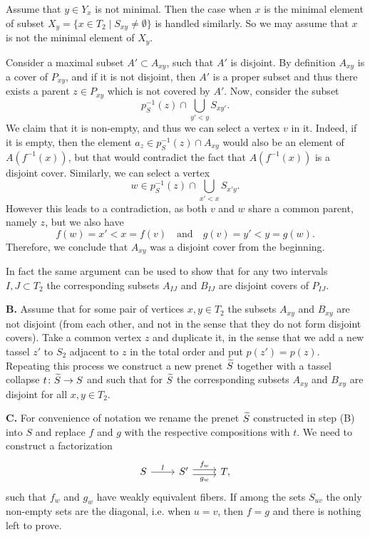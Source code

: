 \documentclass[letterpaper,12pt,leqno]{article}
\numberwithin{equation}{theorem}
\begin{document}
Assume that $y \in Y_x$ is not minimal. Then the case when $x$ is the minimal element of subset $X_y = \{x \in T_2 \mid S_{xy} \neq \emptyset\}$ is handled similarly. So we may
assume that $x$ is not the minimal element of $X_y$.

Consider a maximal subset $A' \subset A_{xy}$, such that $A'$ is disjoint. By definition $A_{xy}$ is a cover of $P_{xy}$, and if it is not disjoint, then $A'$ is a proper subset
and thus there exists a parent $z \in P_{xy}$ which is not covered by $A'$. Now, consider the subset
$$
p_S^{-1}(z) \cap \bigcup_{y' < y} S_{xy'}.
$$
We claim that it is non-empty, and thus we can select a vertex $v$ in it. Indeed, if it is empty, then the element $a_z \in p_S^{-1}(z) \cap A_{xy}$ would also be an element of $A(f^{-1}(x))$,
but that would contradict the fact that $A(f^{-1}(x))$ is a disjoint cover. Similarly, we can select a vertex
$$
w \in p_S^{-1}(z) \cap \bigcup_{x' < x} S_{x'y}.
$$
However this leads to a contradiction, as both $v$ and $w$ share a common parent, namely $z$, but we also have
$$
f(w) = x' < x = f(v) \quad\text{and}\quad g(v) = y' < y = g(w).
$$
Therefore, we conclude that $A_{xy}$ was a disjoint cover from the beginning.

In fact the same argument can be used to show that for any two intervals $I, J \subset T_2$ the corresponding subsets $A_{IJ}$ and $B_{IJ}$ are disjoint covers of $P_{IJ}$.

{\bf B.} Assume that for some pair of vertices $x, y \in T_2$ the subsets $A_{xy}$ and $B_{xy}$ are not disjoint (from each other, and not in the sense that they do not form disjoint covers).
Take a common vertex $z$ and duplicate it, in the sense that we add a new tassel $z'$ to $S_2$ adjacent to $z$ in the total order and put $p(z') = p(z)$. Repeating this process we construct
a new prenet $\widetilde S$ together with a tassel collapse $t\colon \widetilde S \to S$ and such that for $\widetilde S$ the corresponding subsets $A_{xy}$ and $B_{xy}$ are disjoint for all $x, y \in T_2$.

{\bf C.}
For convenience of notation we rename the prenet $\widetilde S$ constructed in step (B) into $S$ and replace $f$ and $g$ with the respective compositions with $t$.
We need to construct a factorization 
$$
\begin{tikzcd}
S \ar[r, "l"] & S' \ar[shift left, r, "f_w"] \ar[shift right, r, "g_w"'] & T,
\end{tikzcd}
$$
such that $f_w$ and $g_w$ have weakly equivalent fibers. If among the sets $S_{uv}$ the only non-empty sets are the diagonal, i.e. when $u = v$, then $f = g$ and there is nothing left to prove.
\end{document}
